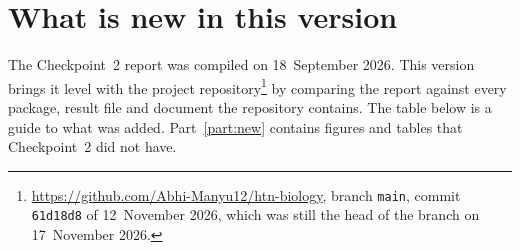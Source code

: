 

\section*{What is new in this version}

The Checkpoint~2 report was compiled on 18~September 2026. This version brings it level with the project
repository\footnote{\url{https://github.com/Abhi-Manyu12/htn-biology}, branch \texttt{main}, commit
\texttt{61d18d8} of 12~November 2026, which was still the head of the branch on 17~November 2026.} by
comparing the report against every package, result file and document the repository contains.
The table below is a guide to what was added. Part~\ref{part:new} contains \newfigcount{} figures
and \newtabcount{} tables that Checkpoint~2 did not have.

